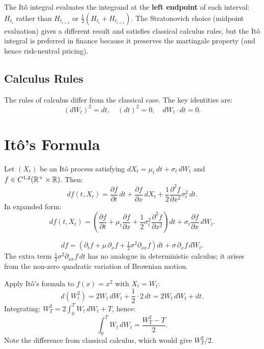 \begin{warning}[title=\textbf{It\^o vs Stratonovich}]
The It\^o integral evaluates the integrand at the \textbf{left endpoint}
of each interval: $H_{t_i}$ rather than $H_{t_{i+1}}$ or
$\frac{1}{2}(H_{t_i} + H_{t_{i+1}})$. The Stratonovich choice (midpoint
evaluation) gives a different result and satisfies classical calculus rules,
but the It\^o integral is preferred in finance because it preserves the
martingale property (and hence risk-neutral pricing).
\end{warning}

\subsection{Calculus Rules}

The rules of calculus differ from the classical case. The key identities are:
\[
    (dW_t)^2 = dt, \quad (dt)^2 = 0, \quad dW_t \cdot dt = 0.
\]

\section{It\^o's Formula}

\begin{theorem}
\label{thm:ito_formula}
Let $(X_t)$ be an It\^o process satisfying
$dX_t = \mu_t\,dt + \sigma_t\,dW_t$
and $f \in C^{1,2}(\mathbb{R}^+ \times \mathbb{R})$. Then:
\[
    df(t, X_t) = \frac{\partial f}{\partial t}\,dt
    + \frac{\partial f}{\partial x}\,dX_t
    + \frac{1}{2}\frac{\partial^2 f}{\partial x^2}\sigma_t^2\,dt.
\]
In expanded form:
\[
    df(t, X_t) = \left(\frac{\partial f}{\partial t}
    + \mu_t\frac{\partial f}{\partial x}
    + \frac{1}{2}\sigma_t^2\frac{\partial^2 f}{\partial x^2}\right)dt
    + \sigma_t\frac{\partial f}{\partial x}\,dW_t.
\]
\end{theorem}

\begin{keyformulas}[title=\textbf{It\^o's Formula --- Compact Form}]
\[
    df = \left(\partial_t f + \mu\,\partial_x f
    + \tfrac{1}{2}\sigma^2\partial_{xx} f\right)dt
    + \sigma\,\partial_x f\,dW_t.
\]
The extra term $\frac{1}{2}\sigma^2\partial_{xx}f\,dt$ has no analogue
in deterministic calculus; it arises from the non-zero quadratic variation
of Brownian motion.
\end{keyformulas}

\begin{example}
Apply It\^o's formula to $f(x) = x^2$ with $X_t = W_t$:
\[
    d(W_t^2) = 2W_t\,dW_t + \frac{1}{2}\cdot 2\,dt = 2W_t\,dW_t + dt.
\]
Integrating: $W_T^2 = 2\int_0^T W_t\,dW_t + T$, hence:
\[
    \int_0^T W_t\,dW_t = \frac{W_T^2 - T}{2}.
\]
Note the difference from classical calculus, which would give $W_T^2/2$.
\end{example}

